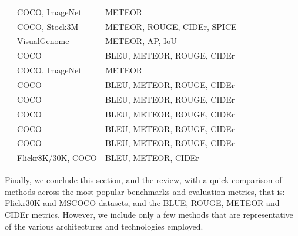 \begin{longtable}{ p{} p{} p{} }
    \citet{Venugopalan2017} & COCO, ImageNet & METEOR \\
    \citet{Wang2017} & COCO, Stock3M & METEOR, ROUGE, CIDEr, SPICE \\
    \citet{Yang2017} & VisualGenome & METEOR, AP, IoU \\
    \citet{Yao2017_ATT} & COCO & BLEU, METEOR, ROUGE, CIDEr \\
    \citet{Yao2017_NOB} & COCO, ImageNet & METEOR \\
    \citet{Zhang2017} & COCO & BLEU, METEOR, ROUGE, CIDEr \\
    \citet{Aneja2018} & COCO & BLEU, METEOR, ROUGE, CIDEr \\
    \citet{Jiang2018} & COCO & BLEU, METEOR, ROUGE, CIDEr\\
    \citet{Khademi2018} & COCO & BLEU, METEOR, ROUGE, CIDEr\\
    \citet{Wang2018} & COCO & BLEU, METEOR, ROUGE, CIDEr \\
    \citet{Wu2018} & Flickr8K/30K, COCO & BLEU, METEOR, CIDEr \\
    \bottomrule
\end{longtable}
\label{tab:nn_methods_datasets_metrics}
\endgroup

Finally, we conclude this section, and the review, with a quick  comparison of methods across the most popular benchmarks and evaluation metrics, that is: Flickr30K and MSCOCO datasets, and the BLUE, ROUGE, METEOR and CIDEr metrics. However, we include only a few methods that are representative of the various architectures and technologies employed.

